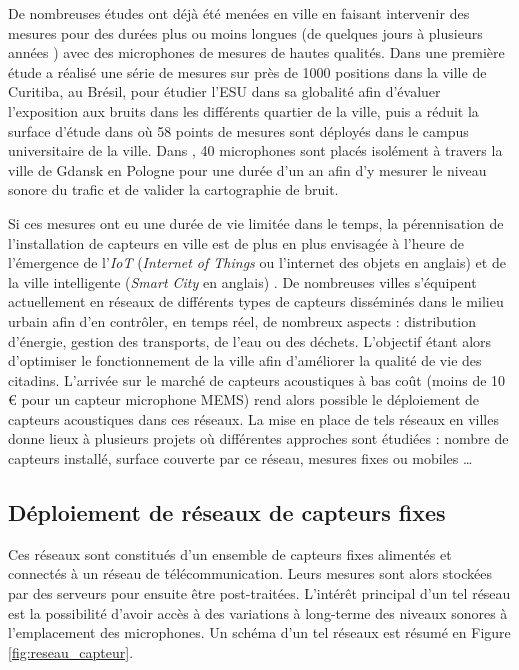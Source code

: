 De nombreuses études ont déjà été menées en ville en faisant intervenir des mesures pour des durées plus ou moins longues (de quelques jours \cite{romeu2011street} à plusieurs années \cite{gaja2003sampling}) avec des microphones de mesures de hautes qualités. Dans une première étude \cite{zannin2002environmental} a réalisé une série de mesures sur près de 1000 positions dans la ville de Curitiba, au Brésil, pour étudier l'ESU dans sa globalité afin d'évaluer l'exposition aux bruits dans les différents quartier de la ville, puis a réduit la surface d'étude dans \cite{zannin_characterization_2013} où 58 points de mesures sont déployés dans le campus universitaire de la ville. 
Dans \cite{Mioduszewski}, 40 microphones sont placés isolément à travers la ville de Gdansk en Pologne pour une durée d'un an afin d'y mesurer le niveau sonore du trafic et de valider la cartographie de bruit. 

Si ces mesures ont eu une durée de vie limitée dans le temps, la pérennisation de l'installation de capteurs en ville est de plus en plus envisagée à l'heure de l'émergence de l'\textit{IoT} (\textit{Internet of Things} ou l'internet des objets en anglais) \cite{zanella2014internet} et de la ville intelligente (\textit{Smart City} en anglais) \cite{chourabi2012understanding}. De nombreuses villes s'équipent actuellement en réseaux de différents types de capteurs disséminés dans le milieu urbain afin d'en contrôler, en temps réel, de nombreux aspects : distribution d'énergie, gestion des transports, de l'eau ou des déchets. L'objectif étant alors d'optimiser le fonctionnement de la ville afin d'améliorer la qualité de vie des citadins. L'arrivée sur le marché de capteurs acoustiques à bas coût (moins de 10 € pour un capteur microphone MEMS) \cite{van2010use} rend alors possible le déploiement de capteurs acoustiques dans ces réseaux. La mise en place de tels réseaux en villes donne lieux à plusieurs projets où différentes approches sont étudiées : nombre de capteurs installé, surface couverte par ce réseau, mesures fixes ou mobiles \dots

\subsection{Déploiement de réseaux de capteurs fixes}

Ces réseaux sont constitués d'un ensemble de capteurs fixes alimentés et connectés à un réseau de télécommunication. Leurs mesures sont alors stockées par des serveurs pour ensuite être post-traitées. L'intérêt principal d'un tel réseau est la possibilité d'avoir accès à des variations à long-terme des niveaux sonores à l'emplacement des microphones. Un schéma d'un tel réseaux est résumé en Figure \ref{fig:reseau_capteur}.

